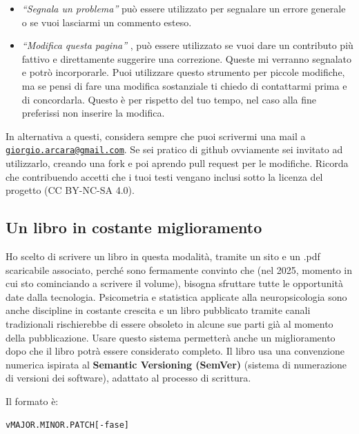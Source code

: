 \documentclass[
  italian,
  letterpaper,
  paper=6in:9in,
  pagesize=pdftex,
  headinclude=on,
  footinclude=on,
  11pt]{scrbook}
\providecommand{\tightlist}{%
  \setlength{\itemsep}{0pt}\setlength{\parskip}{0pt}}
\begin{document}
\begin{itemize}
\tightlist
\item
  \emph{``Segnala un problema''} può essere utilizzato per segnalare un
  errore generale o se vuoi lasciarmi un commento esteso.
\item
  \emph{``Modifica questa pagina''} , può essere utilizzato se vuoi dare
  un contributo più fattivo e direttamente suggerire una correzione.
  Queste mi verranno segnalato e potrò incorporarle. Puoi utilizzare
  questo strumento per piccole modifiche, ma se pensi di fare una
  modifica sostanziale ti chiedo di contattarmi prima e di concordarla.
  Questo è per rispetto del tuo tempo, nel caso alla fine preferissi non
  inserire la modifica.
\end{itemize}

In alternativa a questi, considera sempre che puoi scrivermi una mail a
\href{mailto:giorgio.arcara@gmail.com}{\nolinkurl{giorgio.arcara@gmail.com}}.
Se sei pratico di github ovviamente sei invitato ad utilizzarlo, creando
una fork e poi aprendo pull request per le modifiche. Ricorda che
contribuendo accetti che i tuoi testi vengano inclusi sotto la licenza
del progetto (CC BY-NC-SA 4.0).

\subsection*{Un libro in costante
miglioramento}\label{un-libro-in-costante-miglioramento}

Ho scelto di scrivere un libro in questa modalità, tramite un sito e un
.pdf scaricabile associato, perché sono fermamente convinto che (nel
2025, momento in cui sto cominciando a scrivere il volume), bisogna
sfruttare tutte le opportunità date dalla tecnologia. Psicometria e
statistica applicate alla neuropsicologia sono anche discipline in
costante crescita e un libro pubblicato tramite canali tradizionali
rischierebbe di essere obsoleto in alcune sue parti già al momento della
pubblicazione. Usare questo sistema permetterà anche un miglioramento
dopo che il libro potrà essere considerato completo. Il libro usa una
convenzione numerica ispirata al \textbf{Semantic Versioning (SemVer)}
(sistema di numerazione di versioni dei software), adattato al processo
di scrittura.

Il formato è:

\begin{verbatim}
vMAJOR.MINOR.PATCH[-fase]
\end{verbatim}
\end{document}
